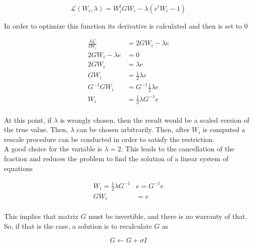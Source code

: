 \documentclass[12pt,journal]{IEEEtran}
\begin{document}
    \begin{equation*}
            \mathcal{L}(W_i, \lambda) = W_i^t G W_i - \lambda (e^t W_i - 1)
    \end{equation*}

    In order to optimize this function its derivative is calculated and then is
    set to 0

    \begin{equation*}
        \begin{aligned}
            \frac{\delta \mathcal{L}}{\delta W_i} &= 2 G W_i - \lambda e\\
            2 G W_i - \lambda e &= 0 \\
            2 G W_i &= \lambda e \\
            G W_i &= \frac{1}{2} \lambda e \\
            G^{-1} G W_i &= G^{-1} \frac{1}{2} \lambda e \\
            W_i &= \frac{1}{2} \lambda G^{-1} e \\
        \end{aligned}
    \end{equation*}

    At this point, if $\lambda$ is wrongly chosen, then the result would be a
    scaled version of the true value. Then, $\lambda$ can be chosen
    arbitrarily. Then, after $W_i$ is computed a rescale procedure can be
    conducted in order to satisfy the restriction.\\

    A good choice for the variable is $\lambda = 2$. This leads to the
    cancellation of the fraction and reduces the problem to find the solution of
    a linear system of equations

    \begin{equation*}
        \begin{aligned}
            W_i = \frac{1}{2} \lambda G^{-1} & e = G^{-1} e \\
            G W_i &= e \\
        \end{aligned}
    \end{equation*}

    This implies that matrix $G$ must be invertible, and there is no warranty
    of that. So, if that is the case, a solution is to recalculate $G$ as

    \begin{equation*}
        G \leftarrow G + \sigma I
    \end{equation*}
\end{document}
